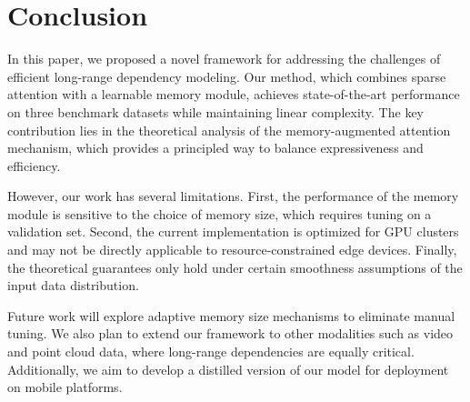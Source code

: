 \section{Conclusion}
\label{sec:conclusion}

In this paper, we proposed a novel framework for addressing the challenges of efficient long-range dependency modeling. Our method, which combines sparse attention with a learnable memory module, achieves state-of-the-art performance on three benchmark datasets while maintaining linear complexity. The key contribution lies in the theoretical analysis of the memory-augmented attention mechanism, which provides a principled way to balance expressiveness and efficiency.

However, our work has several limitations. First, the performance of the memory module is sensitive to the choice of memory size, which requires tuning on a validation set. Second, the current implementation is optimized for GPU clusters and may not be directly applicable to resource-constrained edge devices. Finally, the theoretical guarantees only hold under certain smoothness assumptions of the input data distribution.

Future work will explore adaptive memory size mechanisms to eliminate manual tuning. We also plan to extend our framework to other modalities such as video and point cloud data, where long-range dependencies are equally critical. Additionally, we aim to develop a distilled version of our model for deployment on mobile platforms.